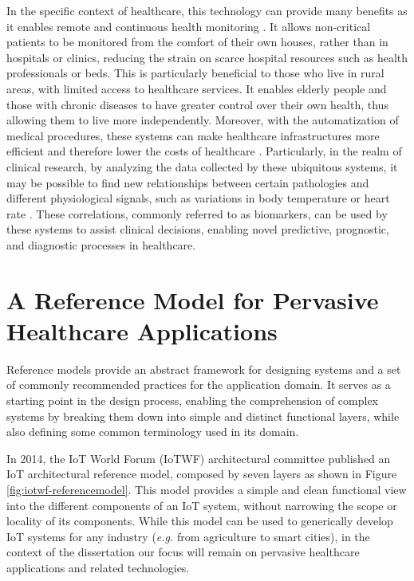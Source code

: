 In the specific context of healthcare, this technology can provide many benefits as it enables remote and continuous health monitoring \cite{Doukas2012, Wu2020, Fan2014}. It allows non-critical patients to be monitored from the comfort of their own houses, rather than in hospitals or clinics, reducing the strain on scarce hospital resources such as health professionals or beds. This is particularly beneficial to those who live in rural areas, with limited access to healthcare services. It enables elderly people and those with chronic diseases to have greater control over their own health, thus allowing them to live more independently. Moreover, with the automatization of medical procedures, these systems can make healthcare infrastructures more efficient and therefore lower the costs of healthcare \cite{Catarinucci2015, Adame2018}. Particularly, in the realm of clinical research, by analyzing the data collected by these ubiquitous systems, it may be possible to find new relationships between certain pathologies and different physiological signals, such as variations in body temperature or heart rate \cite{Choi2016}. These correlations, commonly referred to as biomarkers, can be used by these systems to assist clinical decisions, enabling novel predictive, prognostic, and diagnostic processes in healthcare.

\section{A Reference Model for Pervasive Healthcare Applications}

Reference models provide an abstract framework for designing systems and a set of commonly recommended practices for the application domain. It serves as a starting point in the design process, enabling the comprehension of complex systems by breaking them down into simple and distinct functional layers, while also defining some common terminology used in its domain. \bigskip

In 2014, the \acs{IoT} World Forum (IoTWF) architectural committee published an \acs{IoT} architectural reference model, composed by seven layers as shown in Figure \ref{fig:iotwf-referencemodel}. This model \cite{Cisco2014} provides a simple and clean functional view into the different components of an \acs{IoT} system, without narrowing the scope or locality of its components. While this model can be used to generically develop \acs{IoT} systems for any industry (\textit{e.g.} from agriculture to smart cities), in the context of the dissertation our focus will remain on pervasive healthcare applications and related technologies. \bigskip

